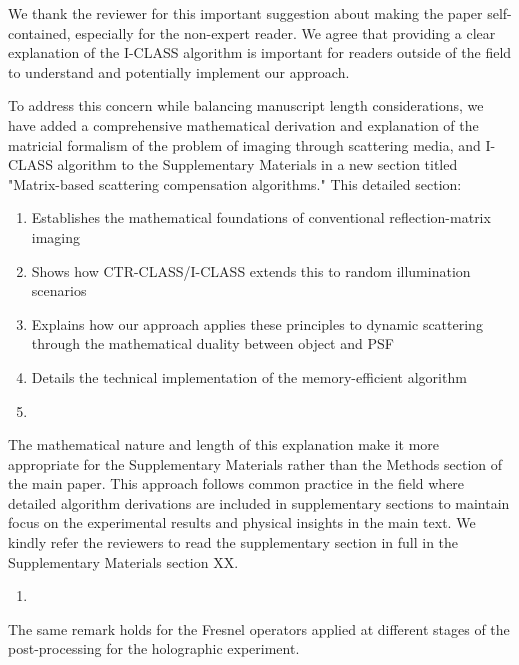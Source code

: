 \documentclass[12pt]{article}
\newenvironment{solved_reviewercomment}
    {\begin{tcolorbox}[width=\linewidth,colback=gray!5,colframe=solved_commentcolor!50,title=Reviewer Comment,left=5pt,right=5pt]}
    {\end{tcolorbox}}
\newenvironment{ourresponse}
    {\begin{tcolorbox}[width=\linewidth,breakable,enhanced,colback=gray!5,colframe=responsecolor!50,title=Response,left=5pt,right=5pt]}
    {\end{tcolorbox}}
\begin{document}
\begin{ourresponse}
We thank the reviewer for this important suggestion about making the paper self-contained, especially for the non-expert reader. We agree that providing a clear explanation of the I-CLASS algorithm is important for readers outside of the field to understand and potentially implement our approach.

To address this concern while balancing manuscript length considerations, we have added a comprehensive mathematical derivation and explanation of the matricial formalism of the problem of imaging through scattering media, and I-CLASS algorithm to the Supplementary Materials in a new section titled "Matrix-based scattering compensation algorithms." This detailed section:

\begin{enumerate}
    \item Establishes the mathematical foundations of conventional reflection-matrix imaging
    \item Shows how CTR-CLASS/I-CLASS extends this to random illumination scenarios
    \item Explains how our approach applies these principles to dynamic scattering through the mathematical duality between object and PSF
    \item Details the technical implementation of the memory-efficient algorithm
    \item \end{enumerate}

The mathematical nature and length of this explanation make it more appropriate for the Supplementary Materials rather than the Methods section of the main paper. This approach follows common practice in the field where detailed algorithm derivations are included in supplementary sections to maintain focus on the experimental results and physical insights in the main text.
We kindly refer the reviewers to read the supplementary section in full in the Supplementary Materials section XX.

\end{ourresponse}


\begin{enumerate}[label=\arabic*., resume]
\item \leavevmode
\end{enumerate}
\vspace{-1em}
\begin{solved_reviewercomment}
    The same remark holds for the Fresnel operators applied at different stages of the post-processing for the holographic experiment.
\end{solved_reviewercomment}
\end{document}
